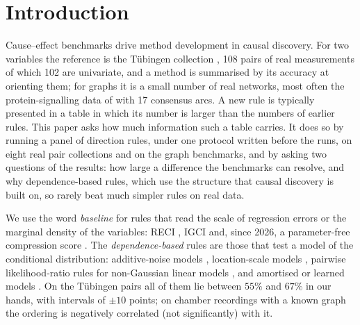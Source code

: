 \section{Introduction}\label{sec:intro}

Cause--effect benchmarks drive method development in causal discovery. For two variables the reference is the T\"ubingen collection \citep{mooij2016distinguishing}, 108 pairs of real measurements of which 102 are univariate, and a method is summarised by its accuracy at orienting them; for graphs it is a small number of real networks, most often the protein-signalling data of \citet{sachs2005causal} with 17 consensus arcs. A new rule is typically presented in a table in which its number is larger than the numbers of earlier rules. This paper asks how much information such a table carries. It does so by running a panel of direction rules, under one protocol written before the runs, on eight real pair collections and on the graph benchmarks, and by asking two questions of the results: how large a difference the benchmarks can resolve, and why dependence-based rules, which use the structure that causal discovery is built on, so rarely beat much simpler rules on real data.

We use the word \emph{baseline} for rules that read the scale of regression errors or the marginal density of the variables: RECI \citep{blobaum2018cause}, IGCI \citep{daniusis2010inferring} and, since 2026, a parameter-free compression score \citep{stienstra2026oneruler}. The \emph{dependence-based} rules are those that test a model of the conditional distribution: additive-noise models \citep{hoyer2009nonlinear,peters2014identifiability}, location-scale models \citep{immer2023loci}, pairwise likelihood-ratio rules for non-Gaussian linear models \citep{hyvarinen2013pairwise}, and amortised or learned models \citep{lorch2022amortized}. On the T\"ubingen pairs all of them lie between $55\%$ and $67\%$ in our hands, with intervals of $\pm 10$ points; on chamber recordings with a known graph the ordering is negatively correlated (not significantly) with it.

